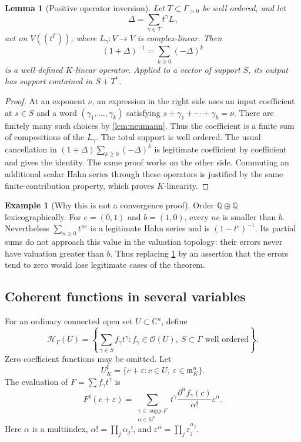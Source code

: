 \documentclass[11pt]{article}
\newtheorem{lemma}[theorem]{Lemma}
\theoremstyle{definition}
\newtheorem{example}[theorem]{Example}
\newcommand{\C}{\mathbb C}
\newcommand{\Q}{\mathbb Q}
\newcommand{\N}{\mathbb N}
\newcommand{\OO}{\mathcal O}
\newcommand{\HH}{\mathcal H}
\newcommand{\mm}{\mathfrak m}
\newcommand{\supp}{\operatorname{supp}}
\newcommand{\sh}{^{\sharp}}
\newcommand{\eps}{\varepsilon}
\begin{document}
\begin{lemma}[Positive operator inversion]\label{lem:operator}
Let $T\subset\Gamma_{>0}$ be well ordered, and let
\[
 \Delta=\sum_{\gamma\in T}t^\gamma L_\gamma
\]
act on $V((t^\Gamma))$, where $L_\gamma:V\to V$ is complex-linear. Then
\begin{equation}\label{eq:neumannoperator}
 (1+\Delta)^{-1}=\sum_{k\ge0}(-\Delta)^k
\end{equation}
is a well-defined $K$-linear operator. Applied to a vector of support $S$, its output has support contained in $S+T^*$.
\end{lemma}
\begin{proof}
At an exponent $\nu$, an expression in the right side uses an input coefficient at $s\in S$ and a word $(\gamma_1,\ldots,\gamma_k)$ satisfying $s+\gamma_1+\cdots+\gamma_k=\nu$. There are finitely many such choices by \cref{lem:neumann}. Thus the coefficient is a finite sum of compositions of the $L_\gamma$. The total support is well ordered. The usual cancellation in $(1+\Delta)\sum_{k\ge0}(-\Delta)^k$ is legitimate coefficient by coefficient and gives the identity. The same proof works on the other side. Commuting an additional scalar Hahn series through these operators is justified by the same finite-contribution property, which proves $K$-linearity.
\end{proof}

\begin{example}[Why this is not a convergence proof]\label{ex:ranktwo}
Order $\Q\oplus\Q$ lexicographically. For $e=(0,1)$ and $b=(1,0)$, every $ne$ is smaller than $b$. Nevertheless $\sum_{n\ge0}t^{ne}$ is a legitimate Hahn series and is $(1-t^e)^{-1}$. Its partial sums do not approach this value in the valuation topology: their errors never have valuation greater than $b$. Thus replacing \cref{lem:operator} by an assertion that the errors tend to zero would lose legitimate cases of the theorem.
\end{example}

\subsection{Coherent functions in several variables}
For an ordinary connected open set $U\subset\C^n$, define
\[
 \HH_\Gamma(U)=\left\{\sum_{\gamma\in S}f_\gamma t^\gamma:
 f_\gamma\in\OO(U),\ S\subset\Gamma\text{ well ordered}\right\}.
\]
Zero coefficient functions may be omitted. Let
\[
 U\sh_K=\{c+\eps:c\in U,\ \eps\in\mm_K^n\}.
\]
The evaluation of $F=\sum f_\gamma t^\gamma$ is
\begin{equation}\label{eq:evaluation}
 F\sh(c+\eps)=
 \sum_{\substack{\gamma\in\supp F\\\alpha\in\N^n}}
 t^\gamma\frac{\partial^\alpha f_\gamma(c)}{\alpha!}\eps^\alpha.
\end{equation}
Here $\alpha$ is a multiindex, $\alpha!=\prod_j\alpha_j!$, and $\eps^\alpha=\prod_j\eps_j^{\alpha_j}$.
\end{document}
